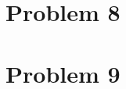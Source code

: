 \documentclass[aps,rmp,preprint,amsmath,amssymb,longbibliography,floatfix]{revtex4-1}
\begin{document}
\section{Problem 8}
\label{sec:prob8}



\section{Problem 9}
\label{sec:prob9}







\newpage


\appendix

\end{document}

